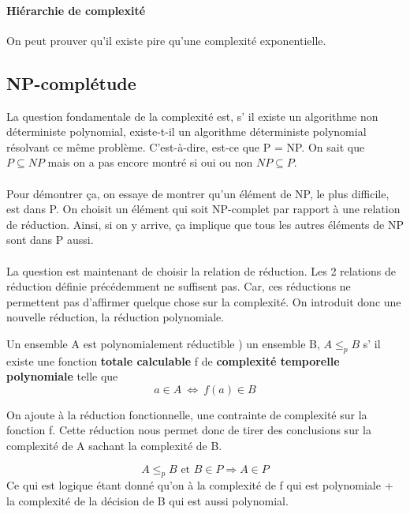\paragraph{Hiérarchie de complexité}
On peut prouver qu'il existe pire qu'une complexité exponentielle.

\subsection{NP-complétude}
La question fondamentale de la complexité est, s’ il existe un algorithme
non déterministe polynomial, existe-t-il un algorithme déterministe polynomial
résolvant ce même problème. C'est-à-dire, est-ce que P = NP. On sait que $P
\subseteq NP$ mais on a pas encore montré si oui ou non $NP\subseteq P$.

\paragraph{} Pour démontrer ça, on essaye de montrer qu'un élément de NP, le
plus difficile, est dans P. On choisit un élément qui soit NP-complet par
rapport à une relation de réduction. Ainsi, si on y arrive, ça implique que
tous les autres éléments de NP sont dans P aussi.

\paragraph{} La question est maintenant de choisir la relation de réduction.
Les 2 relations de réduction définie précédemment ne suffisent pas. Car, ces
réductions ne permettent pas d'affirmer quelque chose sur la complexité. On
introduit donc une nouvelle réduction, la réduction polynomiale.

\begin{mydef}
	Un ensemble A est polynomialement réductible ) un ensemble B, $A \leq
	_p B$ s’ il existe une fonction \textbf{totale calculable} f de
	\textbf{complexité temporelle polynomiale} telle que 
	\[a\in A \ \Leftrightarrow \ f(a)\in B \]
\end{mydef}

\begin{myrem}
	On ajoute à la réduction fonctionnelle, une contrainte de complexité
	sur la fonction f. Cette réduction nous permet donc de tirer des
	conclusions sur la complexité de A sachant la complexité de B.
\end{myrem}

\begin{myprop}
	\[ A \leq_p B \text{ et } B\in P \Rightarrow A\in P \]
	Ce qui est logique étant donné qu'on à la complexité de f qui est
	polynomiale + la complexité de la décision de B qui est aussi
	polynomial.
\end{myprop}

